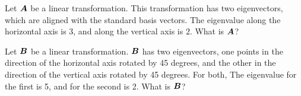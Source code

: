 \documentclass[11pt]{article}
\begin{document}
Let ${\bm A}$ be a linear transformation. This transformation has two eigenvectors, which are aligned with the standard basis vectors. The eigenvalue along the horizontal axis is $3$, and along the vertical axis is $2$. What is ${\bm A}$?


Let ${\bm B}$ be a linear transformation. ${\bm B}$ has two eigenvectors, one points in the direction of the horizontal axis rotated by 45 degrees, and the other in the direction of the vertical axis rotated by 45 degrees.
For both, The eigenvalue for the first is 5, and for the second is 2. What is ${\bm B}$?
\end{document}
